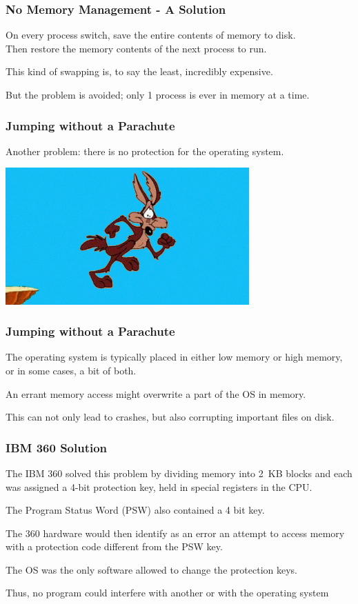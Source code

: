 \begin{frame}
\frametitle{No Memory Management - A Solution}

On every process switch, save the entire contents of memory to disk.\\
\quad Then restore the memory contents of the next process to run. 

This kind of swapping is, to say the least, incredibly expensive.

But the problem is avoided; only 1 process is ever in memory at a time.


\end{frame}

\begin{frame}
\frametitle{Jumping without a Parachute}

Another problem: there is no protection for the operating system. 

\begin{center}
	\includegraphics[width=0.7\textwidth]{images/wileecoyote.jpg}
\end{center}

\end{frame}

\begin{frame}
\frametitle{Jumping without a Parachute}

The operating system is typically placed in either low memory or high memory, or in some cases, a bit of both. 

An errant memory access might overwrite a part of the OS in memory.

This can not only lead to crashes, but also corrupting important files on disk.



\end{frame}

\begin{frame}
\frametitle{IBM 360 Solution}

 The IBM 360 solved this problem by dividing memory into 2~KB blocks and each was assigned a 4-bit protection key, held in special registers in the CPU. 
 
The Program Status Word (PSW) also contained a 4 bit key. 

The 360 hardware would then identify as an error an attempt to access memory with a protection code different from the PSW key. 

The OS was the only software allowed to change the protection keys. 

Thus, no program could interfere with another or with the operating system


\end{frame}

